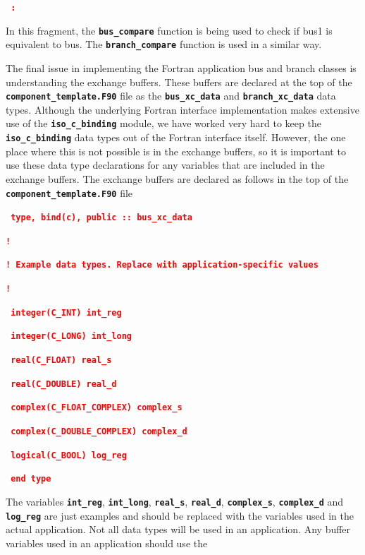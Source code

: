 \documentclass[12pt]{report} %
\begin{document}
\textcolor{red}{\texttt{\textbf{    :}}}

In this fragment, the \texttt{\textbf{bus\_compare}} function is being used to check if bus1 is equivalent to bus. The \texttt{\textbf{branch\_compare}} function is used in a similar way.

The final issue in implementing the Fortran application bus and branch classes is understanding the exchange buffers. These buffers are declared at the top of the \texttt{\textbf{component\_template.F90}} file as the \texttt{\textbf{bus\_xc\_data}} and \texttt{\textbf{branch\_xc\_data}} data types. Although the underlying Fortran interface implementation makes extensive use of the \texttt{\textbf{iso\_c\_binding}} module, we have worked very hard to keep the \texttt{\textbf{iso\_c\_binding}} data types out of the Fortran interface itself. However, the one place where this is not possible is in the exchange buffers, so it is important to use these data type declarations for any variables that are included in the exchange buffers. The exchange buffers are declared as follows in the top of the \texttt{\textbf{component\_template.F90}} file

\textcolor{red}{\texttt{\textbf{  type, bind(c), public :: bus\_xc\_data}}}

\textcolor{red}{\texttt{\textbf{!}}}

\textcolor{red}{\texttt{\textbf{!  Example data types. Replace with application-specific values}}}

\textcolor{red}{\texttt{\textbf{!}}}

\textcolor{red}{\texttt{\textbf{    integer(C\_INT) int\_reg}}}

\textcolor{red}{\texttt{\textbf{    integer(C\_LONG) int\_long}}}

\textcolor{red}{\texttt{\textbf{    real(C\_FLOAT) real\_s}}}

\textcolor{red}{\texttt{\textbf{    real(C\_DOUBLE) real\_d}}}

\textcolor{red}{\texttt{\textbf{    complex(C\_FLOAT\_COMPLEX) complex\_s}}}

\textcolor{red}{\texttt{\textbf{    complex(C\_DOUBLE\_COMPLEX) complex\_d}}}

\textcolor{red}{\texttt{\textbf{    logical(C\_BOOL) log\_reg}}}

\textcolor{red}{\texttt{\textbf{  end type}}}

The variables \texttt{\textbf{int\_reg}}, \texttt{\textbf{int\_long}}, \texttt{\textbf{real\_s}}, \texttt{\textbf{real\_d}}, \texttt{\textbf{complex\_s}}, \texttt{\textbf{complex\_d}} and \texttt{\textbf{log\_reg}} are just examples and should be replaced with the variables used in the actual application. Not all data types will be used in an application. Any buffer variables used in an application should use the
\end{document}
